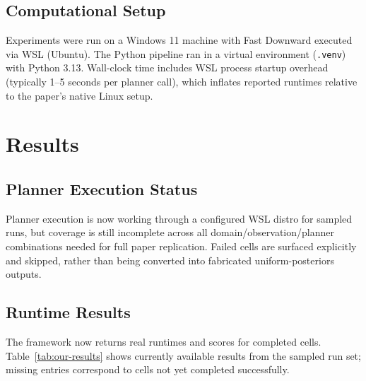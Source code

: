 \documentclass[10pt,twocolumn]{article}
\begin{document}
\subsection{Computational Setup}

Experiments were run on a Windows 11 machine with Fast Downward executed via WSL (Ubuntu). The Python pipeline ran in a virtual environment (\texttt{.venv}) with Python 3.13. Wall-clock time includes WSL process startup overhead (typically 1--5 seconds per planner call), which inflates reported runtimes relative to the paper's native Linux setup.

\section{Results}

\subsection{Planner Execution Status}

Planner execution is now working through a configured WSL distro for sampled runs, but coverage is still incomplete across all domain/observation/planner combinations needed for full paper replication. Failed cells are surfaced explicitly and skipped, rather than being converted into fabricated uniform-posteriors outputs.

\subsection{Runtime Results}

The framework now returns real runtimes and scores for completed cells. Table~\ref{tab:our-results} shows currently available results from the sampled run set; missing entries correspond to cells not yet completed successfully.
\end{document}
